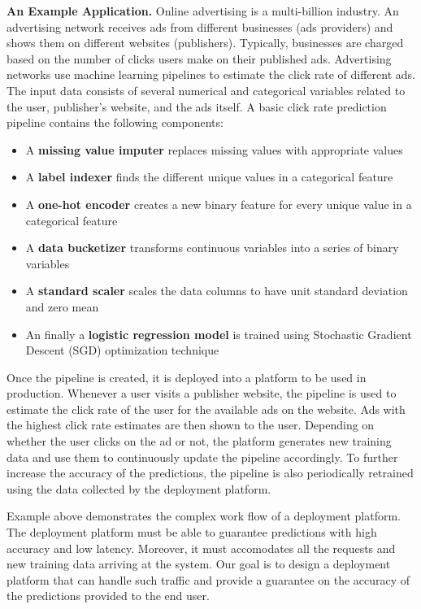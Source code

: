\documentclass[10pt,conference,letterpaper]{IEEEtran}
\begin{document}
\textbf{An Example Application.} 
Online advertising is a multi-billion industry.
An advertising network receives ads from different businesses (ads providers) and shows them on different websites (publishers).
Typically, businesses are charged based on the number of clicks users make on their published ads.
Advertising networks use machine learning pipelines to estimate the click rate of different ads.
The input data consists of several numerical and categorical variables related to the user, publisher's website, and the ads itself.
A basic click rate prediction pipeline contains the following components:
\begin{itemize}
\item A \textbf{missing value imputer} replaces missing values with appropriate values
\item A \textbf{label indexer} finds the different unique values in a categorical feature 
\item A \textbf{one-hot encoder} creates a new binary feature for every unique value in a categorical feature
\item A \textbf{data bucketizer} transforms continuous variables into a series of binary variables
\item A \textbf{standard scaler} scales the data columns to have unit standard deviation and zero mean
\item An finally a \textbf{logistic regression model} is trained using Stochastic Gradient Descent (SGD) optimization technique
\end{itemize}
Once the pipeline is created, it is deployed into a platform to be used in production.
Whenever a user visits a publisher website, the pipeline is used to estimate the click rate of the user for the available ads on the website.
Ads with the highest click rate estimates are then shown to the user.
Depending on whether the user clicks on the ad or not, the platform generates new training data and use them to continuously update the pipeline accordingly. 
To further increase the accuracy of the predictions, the pipeline is also periodically retrained using the data collected by the deployment platform.

Example above demonstrates the complex work flow of a deployment platform.
The deployment platform must be able to guarantee predictions with high accuracy and low latency.
Moreover, it must accomodates all the requests and new training data arriving at the system. 
Our goal is to design a deployment platform that can handle such traffic and provide a guarantee on the accuracy of the predictions provided to the end user.
\end{document}

